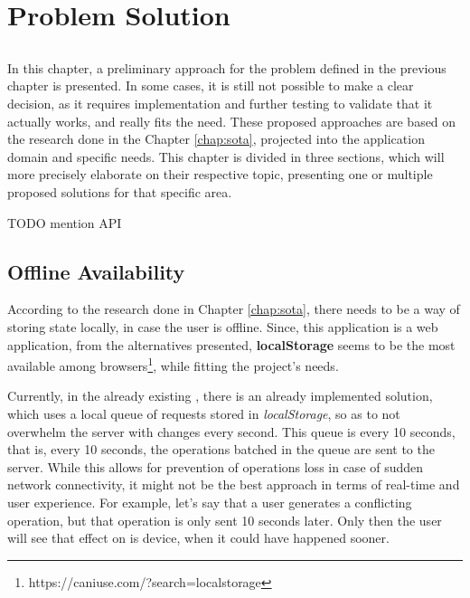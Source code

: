 \chapter{Problem Solution}\label{chap:problem-solution}

\section*{}

In this chapter, a preliminary approach for the problem defined in the previous chapter is presented. In some cases, it is still not possible to make a clear decision, as it requires implementation and further testing to validate that it actually works, and really fits the need. These proposed approaches are based on the research done in the Chapter \ref{chap:sota}, projected into the application domain and specific needs. This chapter is divided in three sections, which will more precisely elaborate on their respective topic, presenting one or multiple proposed solutions for that specific area. 

TODO mention API



\section{Offline Availability} \label{sec:prob-solution-offline-avail}
According to the research done in Chapter \ref{chap:sota}, there needs to be a way of storing state locally, in case the user is offline. Since, this application is a web application, from the alternatives presented, \textbf{localStorage} seems to be the most available among browsers\footnote{https://caniuse.com/?search=localstorage}, while fitting the project's needs. 

Currently, in the already existing , there is an already implemented solution, which uses a local queue of requests stored in \textit{localStorage}, so as to not overwhelm the server with changes every second. This queue is  every 10 seconds, that is, every 10 seconds, the operations batched in the queue are sent to the server. While this allows for prevention of operations loss in case of sudden network connectivity, it might not be the best approach in terms of real-time and user experience. For example, let's say that a user generates a conflicting operation, but that operation is only sent 10 seconds later. Only then the user will see that effect on is device, when it could have happened sooner.

